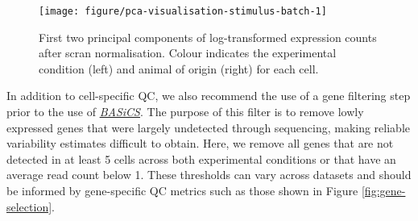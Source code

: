 \documentclass[9pt,a4paper,]{extarticle}
\begin{document}
\begin{figure}

{\centering \texttt{[image: figure/pca-visualisation-stimulus-batch-1]} 

}

\caption{First two principal components of log-transformed expression counts after scran normalisation. Colour indicates the experimental condition (left) and animal of origin (right) for each cell.}\label{fig:pca-visualisation-stimulus-batch}
\end{figure}

In addition to cell-specific QC, we also recommend the use of a gene filtering
step prior to the use of \emph{\href{https://bioconductor.org/packages/3.11/BASiCS}{BASiCS}}.
The purpose of this filter is to remove lowly expressed genes that were largely
undetected through sequencing, making reliable variability estimates difficult
to obtain.
Here, we remove all genes that are not detected in at least 5 cells across both
experimental conditions or that have an average read count below 1.
These thresholds can vary across datasets and should be informed by
gene-specific QC metrics such as those shown in
Figure \ref{fig:gene-selection}.
\end{document}
